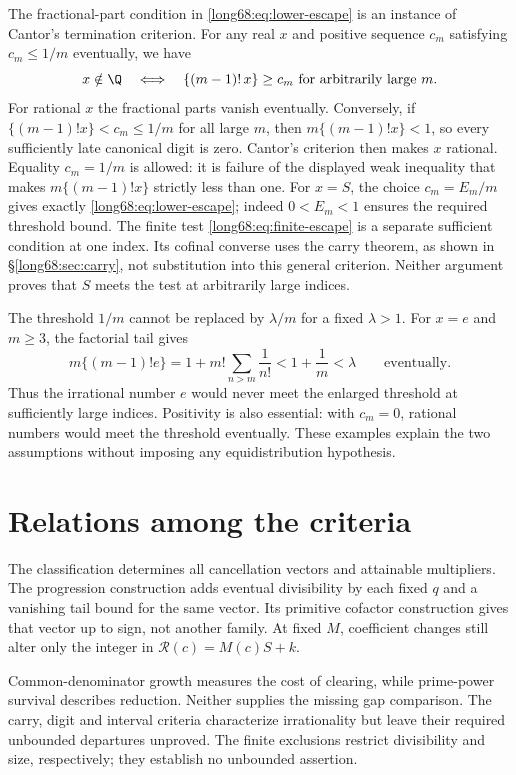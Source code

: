 The fractional-part condition in \eqref{long68:eq:lower-escape} is an
instance of Cantor's termination criterion. For any real $x$ and
positive sequence $c_m$ satisfying $c_m\le1/m$ eventually, we have
\[
 x\notin\Q
 \quad\Longleftrightarrow\quad
 \{(m-1)!\,x\}\ge c_m\ \hbox{for arbitrarily large }m .
\]
For rational $x$ the fractional parts vanish eventually. Conversely, if
$\{(m-1)!x\}<c_m\le1/m$ for all large $m$, then
$m\{(m-1)!x\}<1$, so every sufficiently late canonical digit is zero.
Cantor's criterion then makes $x$ rational. Equality $c_m=1/m$ is allowed:
it is failure of the displayed weak inequality that makes
$m\{(m-1)!x\}$ strictly less than one.
For $x=S$, the choice $c_m=E_m/m$ gives exactly
\eqref{long68:eq:lower-escape}; indeed $0<E_m<1$ ensures the required
threshold bound. The finite test \eqref{long68:eq:finite-escape} is a
separate sufficient condition at one index. Its cofinal converse uses
the carry theorem, as shown in \S\ref{long68:sec:carry}, not substitution
into this general criterion. Neither argument proves that $S$ meets
the test at arbitrarily large indices.

The threshold $1/m$ cannot be replaced by $\lambda/m$ for a fixed
$\lambda>1$. For $x=e$ and $m\ge3$, the factorial tail gives
\[
 m\{(m-1)!e\}
 =1+m!\sum_{n>m}\frac1{n!}<1+\frac1m<\lambda
 \qquad\text{eventually}.
\]
Thus the irrational number $e$ would never meet the enlarged threshold
at sufficiently large indices. Positivity is also essential: with
$c_m=0$, rational numbers would meet the threshold eventually. These
examples explain the two assumptions without imposing any
equidistribution hypothesis.
\section{Relations among the criteria}\label{sec:erdos-68-complete-family-map}
The classification determines all cancellation vectors and attainable
multipliers. The progression construction adds eventual divisibility
by each fixed $q$ and a vanishing tail bound for the same vector.
Its primitive cofactor construction gives that vector up to sign, not
another family. At fixed $M$, coefficient changes still alter only the
integer in $\mathcal R(c)=M(c)S+k$.

Common-denominator growth measures the cost of clearing, while
prime-power survival describes reduction. Neither supplies the missing
gap comparison. The carry, digit and interval criteria characterize
irrationality but leave their required unbounded departures unproved.
The finite exclusions restrict divisibility and size, respectively;
they establish no unbounded assertion.

